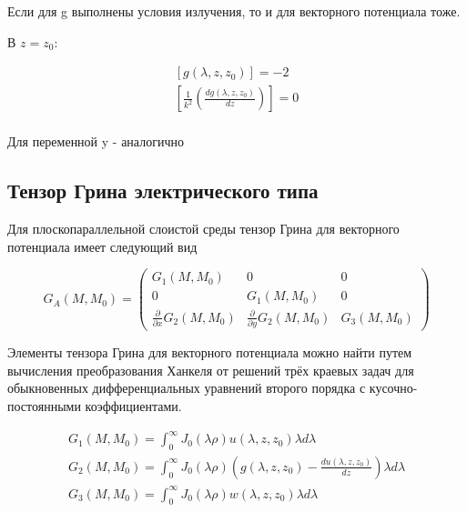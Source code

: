 	Если для g выполнены условия излучения, то и для векторного потенциала тоже.
	
	В $z = z_0$:
	
	\begin{equation}
		\begin{aligned}
			[g(\lambda, z, z_0)] = - 2 \\ [\frac{1}{k^2}( \frac{dg(\lambda, z, z_0)}{dz})] = 0 \\ 
		\end{aligned}
	\end{equation}
	
	Для переменной y - аналогично
	
	\subsection{Тензор Грина электрического типа}
	
	Для плоскопараллельной слоистой среды тензор Грина для
	векторного потенциала имеет следующий вид
	
	\begin{equation}
		G_A(M, M_0) = \begin{pmatrix} G_1(M, M_0) & 0 & 0 \\            0 & G_1(M, M_0) & 0 \\ \frac{\partial}{\partial x}G_2(M, M_0) & \frac{\partial}{\partial y}G_2(M, M_0) & G_3(M, M_0)\end{pmatrix} 
	\end{equation}
	
	Элементы тензора Грина для векторного потенциала можно найти путем вычисления
	преобразования Ханкеля от решений трёх краевых задач для обыкновенных
	дифференциальных уравнений второго порядка с кусочно-постоянными
	коэффициентами.
	
	\begin{equation}
		\begin{aligned}
			G_1(M, M_0) = \int_0^\infty J_0(\lambda \rho) u(\lambda, z, z_0)\lambda d \lambda  \\ G_2(M, M_0) = \int_0^\infty J_0(\lambda \rho) (g(\lambda, z, z_0) - \frac{du(\lambda, z, z_0)}{dz})\lambda d \lambda \\ G_3(M, M_0) = \int_0^\infty J_0(\lambda \rho) w(\lambda, z, z_0)\lambda d \lambda 
		\end{aligned}
	\end{equation}
	
